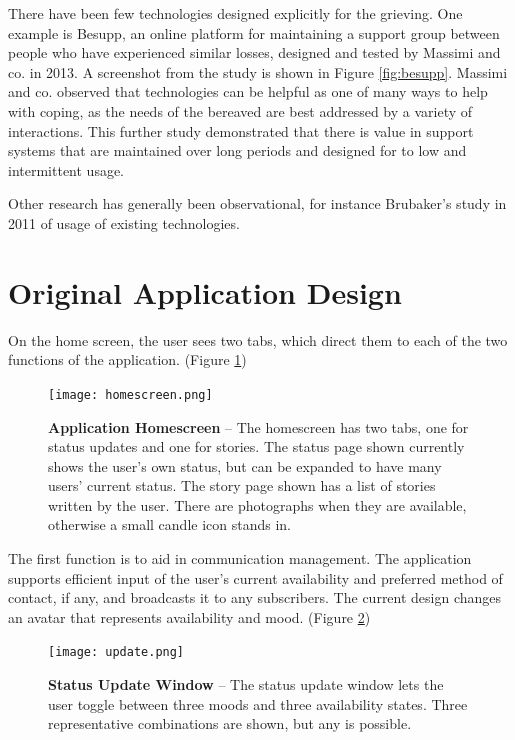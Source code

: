   There have been few technologies designed explicitly for the grieving. One
  example is Besupp, an online platform for maintaining a support group between
  people who have experienced similar losses, designed and tested by Massimi and
  co. in 2013. \cite{mm13}
  A screenshot from the study is shown in Figure \ref{fig:besupp}.
  Massimi and co. observed that technologies can be helpful as
  one of many ways to help with coping, as the needs of the bereaved are best
  addressed by a variety of interactions.
  This further study demonstrated that
  there is value in support systems that are maintained over long periods and
  designed for to low and intermittent usage.

  Other research has generally been observational, for instance Brubaker's study
  in 2011 of usage of existing technologies. \cite{brubaker11}

\section{Original Application Design}
On the home screen, the user sees two tabs,
which direct them to each of the two functions of the application.
(Figure \ref{fig:homescreen})

\begin{figure}
\caption{\textbf{Application Homescreen} --
The homescreen has two tabs, one for status updates and one for stories.
The status page shown currently shows the user's own status,
but can be expanded to have many users' current status.
The story page shown has a list of stories written by the user. There are photographs
when they are available, otherwise a small candle icon stands in.
}
\centering
\texttt{[image: homescreen.png]}
\label{fig:homescreen}
\end{figure}

The first function is to aid in communication management.
The application supports efficient input of the user's current availability
and preferred method of
contact, if any, and broadcasts it to any subscribers.
The current design changes an avatar that represents availability and mood.
(Figure \ref{fig:update})

\begin{figure}
\caption{\textbf{Status Update Window} --
The status update window lets the user toggle between three moods
and three availability states.
Three representative combinations are shown, but any is possible.
}
\centering
\texttt{[image: update.png]}
\label{fig:update}
\end{figure}

